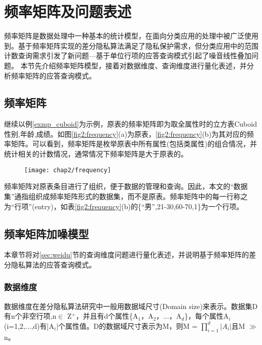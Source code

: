 \section{频率矩阵及问题表述}

频率矩阵是数据处理中一种基本的统计模型，在面向分类应用的处理中被广泛使用到。基于频率矩阵实现的差分隐私算法满足了隐私保护需求，但分类应用中的范围计数查询需求引发了新问题---基于单位行项的应答查询模式引起了噪音线性叠加问题。%
本节先介绍频率矩阵模型，接着对数据维度、查询维度进行量化表述，并分析频率矩阵的应答查询模式。

\subsection{频率矩阵}

继续以例\ref{exmp_cuboid}为示例，原表的频率矩阵即为取全属性时的立方表Cuboid{性别,年龄,成绩}。如图\ref{fig2:frequency}(a)为原表，\ref{fig2:frequency}(b)为其对应的频率矩阵。可以看到，频率矩阵是枚举原表中所有属性(包括类属性)的组合情况，并统计相关的计数情况，通常情况下频率矩阵是大于原表的。

\begin{figure}[!htp]
	\centering
	\texttt{[image: chap2/frequency]}
\end{figure}

频率矩阵对原表条目进行了组织，便于数据的管理和查询。因此，本文的“数据集”通指组织成频率矩阵形式的数据集，而不是原表。频率矩阵中的每一行称之为“行项”(entry)，如表\ref{fig2:frequency}(b)的\{“男”,21-30,60-70,1\}为一个行项。

\subsection{频率矩阵加噪模型}

本章节将对\ref{sec:weidu}节的查询维度问题进行量化表述，并说明基于频率矩阵的差分隐私算法的应答查询模式。

\subsubsection{数据维度}
数据维度在差分隐私算法研究中一般用数据域尺寸(Domain size)来表示。数据集D有n个非空行项,n$\in$ Z$^{+}$，并且有d个属性\{A$_{1}$，A$_{2}$，...，A$_{d}$\}，每个属性A$_{i}$(i=1,2,...,d)有|A$_{i}$|个属性值。D的数据域尺寸表示为M，则M = \(\prod\limits_{i = 1}^d {|A{_i} |}\)且M $\gg$ n。

